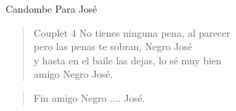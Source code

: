 \begin{song}[candombe]{Candombe Para José}
\begin{verse}{Couplet 4}
No tienes ninguna pena, al parecer\\
pero las penas te sobran, Negro José\\
y hasta en el baile las dejas, lo sé muy bien\\
amigo Negro José. \\
\end{verse}

\begin{verse}{Fin}
amigo Negro .... José. \\
\end{verse}



\end{song}
